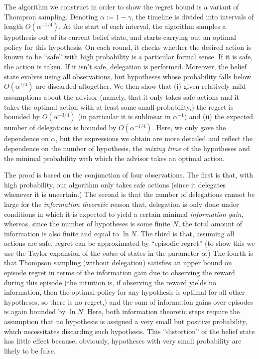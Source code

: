 \documentclass[11pt]{article}
\theoremstyle{definition}
\theoremstyle{plain}
\newcommand{\AP}[1]{\left(#1\right)}
\begin{document}
The algorithm we construct in order to show the regret bound is a variant of Thompson sampling. Denoting $\alpha:=1-\gamma$, the timeline is divided into intervals of length $O\AP{\alpha^{-1/4}}$. At the start of each interval, the algorithm samples a hypothesis out of its current belief state, and starts carrying out an optimal policy for this hypothesis. On each round, it checks whether the desired action is known to be \enquote{safe} with high probability is a particular formal sense. If it is safe, the action is taken. If it isn't safe, delegation is performed. Moreover, the belief state evolves using all observations, but hypotheses whose probability falls below $O\AP{\alpha^{1/4}}$ are discarded altogether. We then show that (i) given relatively mild assumptions about the advisor (namely, that it only takes safe actions and it takes the optimal action with at least some small probability,) the regret is bounded by $O\AP{\alpha^{-3/4}}$ (in particular it is sublinear in $\alpha^{-1}$) and (ii) the expected number of delegations is bounded by $O\AP{\alpha^{-1/4}}$. Here, we only gave the dependence on $\alpha$, but the expressions we obtain are more detailed and reflect the dependence on the number of hypothesis, the \emph{mixing time} of the hypotheses and the minimal probability with which the advisor takes an optimal action.

The proof is based on the conjunction of four observations. The first is that, with high probability, our algorithm only takes safe actions (since it delegates whenever it is uncertain.) The second is that the number of delegations cannot be large for the \emph{information theoretic} reason that, delegation is only done under conditions in which it is expected to yield a certain minimal \emph{information gain}, whereas, since the number of hypotheses is some finite $N$, the total amount of information is also finite and equal to $\ln N$. The third is that, assuming all actions are safe, regret can be approximated by \enquote{episodic regret} (to show this we use the Taylor expansion of the \emph{value} of states in the parameter $\alpha$.) The fourth is that Thompson sampling (without delegation) satisfies an upper bound on episode regret in terms of the information gain due to observing the reward during this episode (the intuition is, if observing the reward yields no information, then the optimal policy for any hypothesis is optimal for all other hypotheses, so there is no regret,) and the sum of information gains over episodes is again bounded by $\ln N$. Here, both information theoretic steps require the assumption that no hypothesis is assigned a very small but positive probability, which necessitates discarding such hypothesis. This \enquote{distortion} of the belief state has little effect because, obviously, hypotheses with very small probability are likely to be false.
\end{document}
